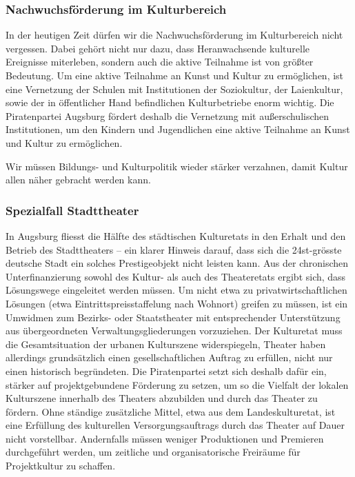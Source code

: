   \subsubsection{Nachwuchsförderung im Kulturbereich}
  
  In der heutigen Zeit dürfen wir die Nachwuchsförderung im Kulturbereich 
  nicht vergessen. Dabei gehört nicht nur dazu, dass Heranwachsende 
  kulturelle Ereignisse miterleben, sondern auch die aktive Teilnahme ist von 
  größter Bedeutung. Um eine aktive Teilnahme an Kunst und Kultur zu 
  ermöglichen, ist eine Vernetzung der Schulen mit Institutionen der 
  Soziokultur, der Laienkultur, sowie der in öffentlicher Hand befindlichen 
  Kulturbetriebe enorm wichtig. Die Piratenpartei Augsburg fördert deshalb die 
  Vernetzung mit außerschulischen Institutionen, um den Kindern und 
  Jugendlichen eine aktive Teilnahme an Kunst und Kultur zu ermöglichen.
  
  Wir müssen Bildungs- und Kulturpolitik wieder stärker verzahnen, damit 
  Kultur allen näher gebracht werden kann.
  
  \subsubsection{Spezialfall Stadttheater}
  
  In Augsburg fliesst die Hälfte des städtischen Kulturetats in den Erhalt 
  und den Betrieb des Stadttheaters – ein klarer Hinweis darauf, dass sich 
  die 24st-grösste deutsche Stadt ein solches Prestigeobjekt nicht leisten 
  kann. Aus der chronischen Unterfinanzierung sowohl des Kultur- als auch des 
  Theateretats ergibt sich, dass Lösungswege eingeleitet werden müssen. Um 
  nicht etwa zu privatwirtschaftlichen Lösungen (etwa Eintrittspreisstaffelung 
  nach Wohnort) greifen zu müssen, ist ein Umwidmen zum Bezirks- oder 
  Staatstheater mit entsprechender Unterstützung aus übergeordneten 
  Verwaltungsgliederungen vorzuziehen. Der Kulturetat muss die 
  Gesamtsituation der urbanen Kulturszene widerspiegeln, Theater haben 
  allerdings grundsätzlich einen gesellschaftlichen Auftrag zu erfüllen, 
  nicht nur einen historisch begründeten. Die Piratenpartei setzt sich 
  deshalb dafür ein, stärker auf projektgebundene Förderung zu setzen, um so 
  die Vielfalt der lokalen Kulturszene innerhalb des Theaters abzubilden und 
  durch das Theater zu fördern. Ohne ständige zusätzliche Mittel, etwa aus 
  dem Landeskulturetat, ist eine Erfüllung des kulturellen 
  Versorgungsauftrags durch das Theater auf Dauer nicht vorstellbar. 
  Andernfalls müssen weniger Produktionen und Premieren durchgeführt werden, 
  um zeitliche und organisatorische Freiräume für Projektkultur zu schaffen.
  
